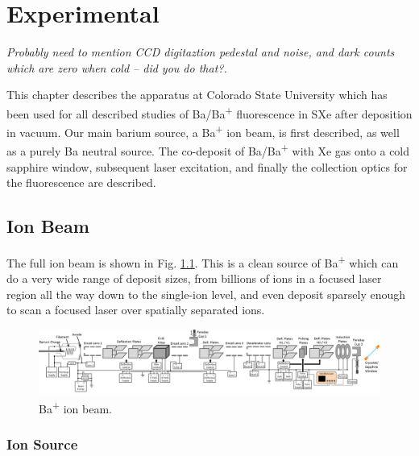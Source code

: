 \chapter{Experimental}

\emph{\color{gray}Probably need to mention CCD digitaztion pedestal and noise, and dark counts which are zero when cold -- did you do that?.}

This chapter describes the apparatus at Colorado State University which has been used for all described studies of Ba/Ba\textsuperscript{+} fluorescence in SXe after deposition in vacuum.  Our main barium source, a Ba\textsuperscript{+} ion beam, is first described, as well as a purely Ba neutral source.  The co-deposit of Ba/Ba\textsuperscript{+} with Xe gas onto a cold sapphire window, subsequent laser excitation, and finally the collection optics for the fluorescence are described.

\section{Ion Beam}

The full ion beam is shown in Fig. \ref{fig:ionbeam}.  This is a clean source of Ba\textsuperscript{+} which can do a very wide range of deposit sizes, from billions of ions in a focused laser region all the way down to the single-ion level, and even deposit sparsely enough to scan a focused laser over spatially separated ions.

\begin{figure} %
        \centering
                \includegraphics[angle=90,width=.25\textwidth]{figures/ionBeam.png}
                \caption{Ba\textsuperscript{+} ion beam.}
\label{fig:ionbeam}
\end{figure}

\subsection{Ion Source}

